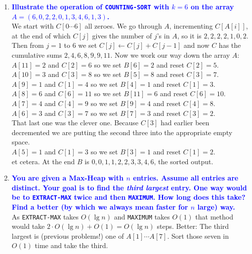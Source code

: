 \documentclass[11pt]{article}
\begin{document}
\begin{enumerate}
\item \textbf{\textcolor{blue}{Illustrate the operation of {\tt COUNTING-SORT} with $k=6$ on
the array $A=(6,0,2,2,0,1,3,4,6,1,3)$.}}
    \\ We start with $C[0\cdots 6]$ all zeroes.  We go through $A$,
    incrementing $C[A[i]]$, at the end of which $C[j]$ gives the number
    of $j$'s in $A$, so it is $2,2,2,2,1,0,2$.  Then from $j=1$ to $6$
    we set $C[j]\leftarrow C[j]+C[j-1]$ and now $C$ has the cumulative
    sums $2,4,6,8,9,9,11$.  Now we work our way down the array $A$:
    \\ $A[11]=2$ and $C[2]=6$ so we set $B[6]=2$ and reset $C[2]=5$.
    \\ $A[10]=3$ and $C[3]=8$ so we set $B[5]=8$ and reset $C[3]=7$.
    \\ $A[9]=1$ and $C[1]=4$ so we set $B[4]=1$ and reset $C[1]=3$.
    \\ $A[8]=6$ and $C[6]=11$ so we set $B[11]=6$ and reset $C[6]=10$.
    \\ $A[7]=4$ and $C[4]=9$ so we set $B[9]=4$ and reset $C[4]=8$.
    \\ $A[6]=3$ and $C[3]=7$ so we set $B[7]=3$ and reset $C[3]=2$.
    \\ That last one was the clever one.  Because $C[3]$ had earlier
    been decremented we are putting the second three into the appropriate
    empty space.  
    \\ $A[5]=1$ and $C[1]=3$ so we set $B[3]=1$ and reset $C[1]=2$.
    \\ et cetera.  At the end $B$ is $0,0,1,1,2,2,3,3,4,6$, the sorted
    output.
\item \textbf{\textcolor{blue}{You are given a Max-Heap with $n$ entries. 
Assume all entries are distinct.  Your goal is to find the {\em third largest} entry.
One way would be to {\tt EXTRACT-MAX} twice and then {\tt MAXIMUM}.
How long does this take?  Find a better (by which we always mean faster for $n$ large) way.}}
    \\ As {\tt EXTRACT-MAX} takes $O(\lg n)$ and {\tt MAXIMUM}
    takes $O(1)$ that method would take $2\cdot O(\lg n)+O(1)=O(\lg n)$
    steps.  Better:  The third largest is (previous problems!) one of
    $A[1]\cdots A[7]$.  Sort those seven in $O(1)$ time and take the third.

\end{enumerate}
\end{document}
